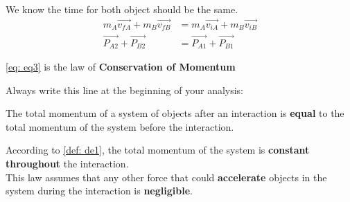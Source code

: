We know the time for both object should be the same.
\begin{align}
    m_A \vec{v_{fA}} + m_B \vec{v_{fB}} &= m_A \vec{v_{iA}} + m_B \vec{v_{iB}} \nonumber\\
    \vec{P_{A2}} + \vec{P_{B2}} &= \vec{P_{A1}} + \vec{P_{B1}} \label{eq: eq3}
\end{align}

\ref{eq: eq3} is the law of \textbf{Conservation of Momentum}

Always write this line at the beginning of your analysis:

\begin{definition} \label{def: de1}
     The total momentum of a system of objects after an interaction is 
    \textbf{equal} to the total momentum of the system before the interaction. 
\end{definition}

According to \ref{def: de1}, the total momentum of the system is \textbf{constant throughout}
the interaction. \\

This law assumes that any other force that could \textbf{accelerate} objects in the system during the 
interaction is \textbf{negligible}.
